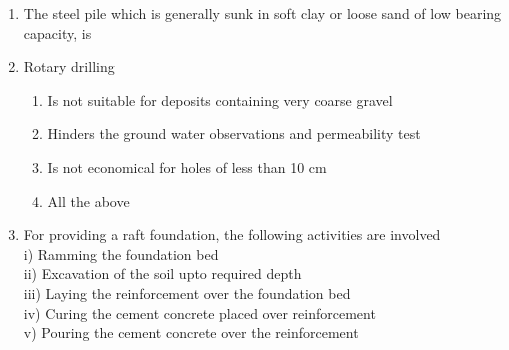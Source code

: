 \documentclass[11pt,a4paper]{article}
\begin{document}
\begin{enumerate}
\item{The steel pile which is generally sunk in soft clay or loose sand of low bearing capacity, is}
\\
\item{Rotary drilling}
\begin{enumerate}[label=\Alph*.]
\item{Is not suitable for deposits containing very coarse gravel}
\item{Hinders the ground water observations and permeability test}
\item{Is not economical for holes of less than 10 cm}
\item{All the above}
\end{enumerate}
\item{For providing a raft foundation, the following activities are involved \\

i) Ramming the foundation bed \\

ii) Excavation of the soil upto required depth \\

iii) Laying the reinforcement over the foundation bed \\

iv) Curing the cement concrete placed over reinforcement \\

v) Pouring the cement concrete over the reinforcement \\

}
\end{enumerate}
\end{document}

